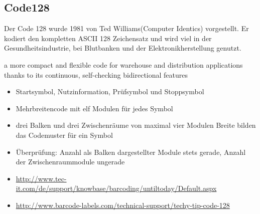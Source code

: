 \subsection*{Code128}
Der Code 128 wurde 1981 von Ted Williams(Computer Identics) vorgestellt. Er kodiert den kompletten ASCII 128 Zeichensatz und wird viel in der Gesundheitsindustrie, bei Blutbanken und der Elektronikherstellung genutzt.

a more compact and flexible code for warehouse and distribution applications thanks to its continuous, self-checking bidirectional features
\begin{itemize}
	\item Startsymbol, Nutzinformation, Prüfsymbol und Stoppsymbol
	\item Mehrbreitencode mit elf Modulen für jedes Symbol
	\item drei Balken und drei Zwischenräume von maximal vier Modulen Breite bilden das Codemuster für ein Symbol
	\item Überprüfung: Anzahl als Balken dargestellter Module stets gerade, Anzahl der Zwischenraummodule ungerade
	\item \url{http://www.tec-it.com/de/support/knowbase/barcoding/untiltoday/Default.aspx}
	\item \url{http://www.barcode-labels.com/technical-support/techy-tip-code-128}
\end{itemize}
